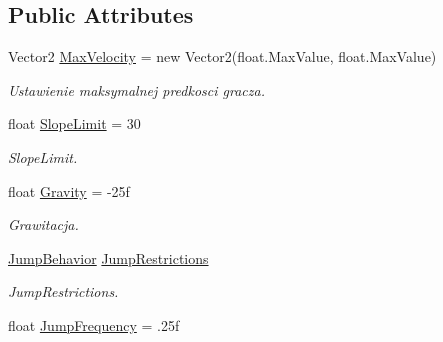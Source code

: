 \subsection*{Public Attributes}
\begin{DoxyCompactItemize}
\item 
\hypertarget{class_controller_parameters2_d_a06ebe9f5ed4fb8a39c1ed11f36659b2b}{}Vector2 \hyperlink{class_controller_parameters2_d_a06ebe9f5ed4fb8a39c1ed11f36659b2b}{Max\+Velocity} = new Vector2(float.\+Max\+Value, float.\+Max\+Value)\label{class_controller_parameters2_d_a06ebe9f5ed4fb8a39c1ed11f36659b2b}

\begin{DoxyCompactList}\small\item\em Ustawienie maksymalnej predkosci gracza. \end{DoxyCompactList}\item 
float \hyperlink{class_controller_parameters2_d_ae706235bff2d67da0d71293bef2ea8d1}{Slope\+Limit} = 30
\begin{DoxyCompactList}\small\item\em Slope\+Limit. \end{DoxyCompactList}\item 
\hypertarget{class_controller_parameters2_d_ae83e87db83f426c232a43dd15e30fb38}{}float \hyperlink{class_controller_parameters2_d_ae83e87db83f426c232a43dd15e30fb38}{Gravity} = -\/25f\label{class_controller_parameters2_d_ae83e87db83f426c232a43dd15e30fb38}

\begin{DoxyCompactList}\small\item\em Grawitacja. \end{DoxyCompactList}\item 
\hypertarget{class_controller_parameters2_d_aa709ad9bce9649d1fbb6e5146c141325}{}\hyperlink{class_controller_parameters2_d_a2838d319f4380bc1120750fdff3dd22f}{Jump\+Behavior} \hyperlink{class_controller_parameters2_d_aa709ad9bce9649d1fbb6e5146c141325}{Jump\+Restrictions}\label{class_controller_parameters2_d_aa709ad9bce9649d1fbb6e5146c141325}

\begin{DoxyCompactList}\small\item\em Jump\+Restrictions. \end{DoxyCompactList}\item 
\hypertarget{class_controller_parameters2_d_ac1215bef2bee5c3e555b92e79ad447cb}{}float \hyperlink{class_controller_parameters2_d_ac1215bef2bee5c3e555b92e79ad447cb}{Jump\+Frequency} = .\+25f\label{class_controller_parameters2_d_ac1215bef2bee5c3e555b92e79ad447cb}


\end{DoxyCompactItemize}
